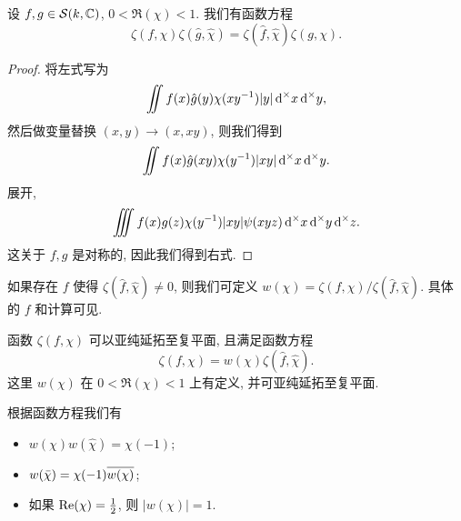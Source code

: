 \begin{lemma}{}{}
设 $f,g\in{\mathcal{S}}(k,{\mathbb{C}})$, $0<\Re(\chi)<1$.
我们有函数方程
	\[\zeta(f,\chi)\zeta(\hat g,\hat \chi)=\zeta(\hat f,\hat\chi)\zeta(g,\chi).\]
\end{lemma}
\begin{proof}
将左式写为
	\[\iint f(x)\hat g(y)\chi(xy^{-1})|y|\mathop{}\!\mathrm{d}^\times x\mathop{}\!\mathrm{d}^\times y,\]
然后做变量替换 $(x,y)\to(x,xy)$, 则我们得到
	\[\iint f(x)\hat g(xy)\chi(y^{-1})|xy|\mathop{}\!\mathrm{d}^\times x\mathop{}\!\mathrm{d}^\times y.\]
展开,
	\[\iiint f(x)g(z)\chi(y^{-1})|xy|\psi(xyz)\mathop{}\!\mathrm{d}^\times x\mathop{}\!\mathrm{d}^\times y\mathop{}\!\mathrm{d}^\times z.\]
这关于 $f,g$ 是对称的, 因此我们得到右式.
\end{proof}

如果存在 $f$ 使得 $\zeta(\hat f,\hat \chi)\neq 0$, 则我们可定义 $w(\chi)=\zeta(f,\chi)/\zeta(\hat f,\hat\chi)$. 具体的 $f$ 和计算可见\cite[Chapter XIV, \S 4]{Lang1994}.

\begin{theorem}{}{}
函数 $\zeta(f,\chi)$ 可以亚纯延拓至复平面, 且满足函数方程
	\[\zeta(f,\chi)=w(\chi)\zeta(\hat f,\hat\chi).\]
这里 $w(\chi)$ 在 $0<\Re(\chi)<1$ 上有定义, 并可亚纯延拓至复平面.
\end{theorem}

\begin{exercise}
根据函数方程我们有
\begin{itemize}
\item $w(\chi)w(\hat \chi)=\chi(-1)$;
\item $w(\bar\chi)=\chi(-1)\overline{w(\chi)}$;
\item 如果 ${\mathrm{Re}}(\chi)=\frac{1}{2}$, 则 $|w(\chi)|=1$.
\end{itemize}
\end{exercise}

%
%
%
%
%









